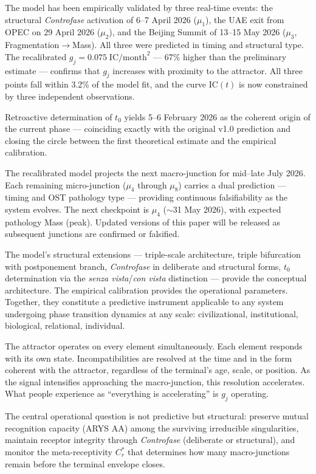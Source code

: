 \documentclass[12pt,a4paper]{article}
\newcommand{\reagmeta}{C_r^{*}}
\newcommand{\gj}{g_j}
\newcommand{\IC}{\mathrm{IC}}
\begin{document}
The model has been empirically validated by three real-time events: the structural \textit{Controfase} activation of 6--7 April 2026 ($\mu_1$), the UAE exit from OPEC on 29 April 2026 ($\mu_2$), and the Beijing Summit of 13--15 May 2026 ($\mu_3$, Fragmentation$\to$Mass). All three were predicted in timing and structural type. The recalibrated $\gj = 0.075\;\mathrm{IC/month}^2$ --- 67\% higher than the preliminary estimate --- confirms that $\gj$ increases with proximity to the attractor. All three points fall within 3.2\% of the model fit, and the curve $\IC(t)$ is now constrained by three independent observations.

Retroactive determination of $t_0$ yields 5--6 February 2026 as the coherent origin of the current phase --- coinciding exactly with the original v1.0 prediction and closing the circle between the first theoretical estimate and the empirical calibration.

The recalibrated model projects the next macro-junction for mid--late July 2026. Each remaining micro-junction ($\mu_4$ through $\mu_8$) carries a dual prediction --- timing and OST pathology type --- providing continuous falsifiability as the system evolves. The next checkpoint is $\mu_4$ ($\sim$31 May 2026), with expected pathology Mass (peak). Updated versions of this paper will be released as subsequent junctions are confirmed or falsified.

The model's structural extensions --- triple-scale architecture, triple bifurcation with postponement branch, \textit{Controfase} in deliberate and structural forms, $t_0$ determination via the \emph{senza vista}/\emph{con vista} distinction --- provide the conceptual architecture. The empirical calibration provides the operational parameters. Together, they constitute a predictive instrument applicable to any system undergoing phase transition dynamics at any scale: civilizational, institutional, biological, relational, individual.

The attractor operates on every element simultaneously. Each element responds with its own state. Incompatibilities are resolved at the time and in the form coherent with the attractor, regardless of the terminal's age, scale, or position. As the signal intensifies approaching the macro-junction, this resolution accelerates. What people experience as ``everything is accelerating'' is $\gj$ operating.

The central operational question is not predictive but structural: preserve mutual recognition capacity (ARYS AA) among the surviving irreducible singularities, maintain receptor integrity through \textit{Controfase} (deliberate or structural), and monitor the meta-receptivity $\reagmeta$ that determines how many macro-junctions remain before the terminal envelope closes.
\end{document}
